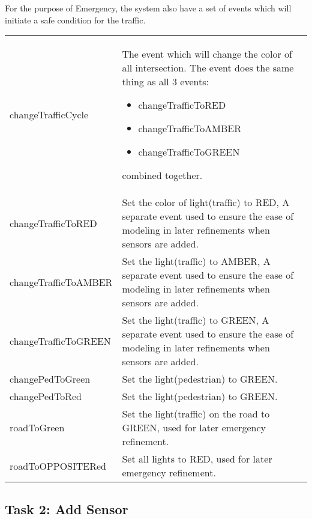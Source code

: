 \documentclass[a4paper]{article}
\begin{document}
\indent For the purpose of Emergency, the system also have a set of events which will initiate a safe condition for the traffic.

\begin{center}
\begin{tabular}{|p{3.5cm}|p{10cm}|}
\hline
\color{blue}{Events} & \color{blue}{Usage}\\
\hline
  changeTrafficCycle & The event which will change the color of all intersection. The event does the same thing as all 3 events:\begin{itemize}
  \item changeTrafficToRED
  \item changeTrafficToAMBER
  \item changeTrafficToGREEN
\end{itemize} combined together.\\
\hline
  changeTrafficToRED & Set the color of light(traffic) to RED, A separate event used to ensure the ease of modeling in later refinements when sensors are added.\\
  \hline
  changeTrafficToAMBER & Set the light(traffic) to AMBER, A separate event used to ensure the ease of modeling in later refinements when sensors are added.\\
  \hline
  changeTrafficToGREEN & Set the light(traffic) to GREEN, A separate event used to ensure the ease of modeling in later refinements when sensors are added.\\
  \hline
  changePedToGreen & Set the light(pedestrian) to GREEN.\\
  \hline
  changePedToRed & Set the light(pedestrian) to GREEN.\\
  \hline
  roadToGreen & Set the light(traffic) on the road to GREEN, used for later emergency refinement.\\
  \hline
  roadToOPPOSITERed & Set all lights to RED, used for later emergency refinement.\\
  \hline
\end{tabular}
\end{center}
\newpage
\subsection{Task 2: Add Sensor}
\end{document}
